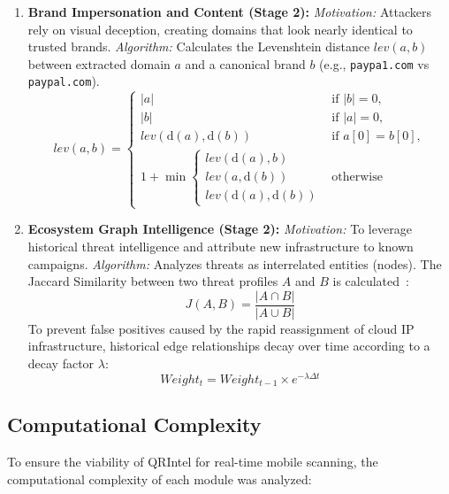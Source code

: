 \documentclass[10pt,twocolumn,letterpaper]{article}
\begin{document}
\begin{enumerate}
    \item \textbf{Brand Impersonation and Content (Stage 2):} 
    \textit{Motivation:} Attackers rely on visual deception, creating domains that look nearly identical to trusted brands.
    \textit{Algorithm:} Calculates the Levenshtein distance $lev(a,b)$ between extracted domain $a$ and a canonical brand $b$ (e.g., \texttt{paypa1.com} vs \texttt{paypal.com}).
    \begin{equation}
    lev(a,b) =
    \begin{cases}
      |a| & \text{if } |b| = 0, \\
      |b| & \text{if } |a| = 0, \\
      lev(\text{d}(a),\text{d}(b)) & \text{if } a[0] = b[0], \\
      1 + \min \begin{cases}
        lev(\text{d}(a), b) \\
        lev(a, \text{d}(b)) \\
        lev(\text{d}(a), \text{d}(b))
      \end{cases} & \text{otherwise}
    \end{cases}
    \end{equation}

    \item \textbf{Ecosystem Graph Intelligence (Stage 2):} 
    \textit{Motivation:} To leverage historical threat intelligence and attribute new infrastructure to known campaigns.
    \textit{Algorithm:} Analyzes threats as interrelated entities (nodes). The Jaccard Similarity between two threat profiles $A$ and $B$ is calculated~\cite{AlQurishi2018}:
    \begin{equation}
    J(A, B) = \frac{|A \cap B|}{|A \cup B|}
    \end{equation}
    To prevent false positives caused by the rapid reassignment of cloud IP infrastructure, historical edge relationships decay over time according to a decay factor $\lambda$:
    \begin{equation}
    Weight_t = Weight_{t-1} \times e^{-\lambda \Delta t}
    \end{equation}
\end{enumerate}

\subsection{Computational Complexity}
To ensure the viability of QRIntel for real-time mobile scanning, the computational complexity of each module was analyzed:
\end{document}
